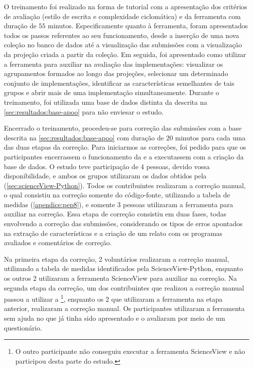 		O treinamento foi realizado na forma de tutorial com a apresentação dos critérios
		de avaliação (estilo de escrita e complexidade ciclomática) e da ferramenta com
		duração de $55$ minutos. Especificamente quanto à ferramenta, foram apresentados
		todos os passos referentes ao seu funcionamento, desde a inserção de uma nova
		coleção no banco de dados até a visualização das submissões com a visualização
		da projeção criada a partir da coleção. Em seguida, foi apresentado como utilizar
		a ferramenta para auxiliar na avaliação das implementações: visualizar os
		agrupamentos formados ao longo das projeções, selecionar um determinado conjunto
		de implementações, identificar as características semelhantes de tais grupos e
		abrir mais de uma implementação simultaneamente. Durante o treinamento, foi utilizada uma
		base de dados distinta da descrita na \cref{sec:resultados:base-apoo} para não
		enviesar o estudo.
		
		Encerrado o treinamento, procedeu-se para correção das submissões com a base
		descrita na \cref{sec:resultados:base-apoo} com duração de $20$ minutos para
		cada uma das duas etapas da correção. Para iniciarmos as correções, foi
		pedido para que os participantes encerrassem o funcionamento da 
		e a executassem com a criação da base de dados. O estudo teve participação
		de 4 pessoas, devido vossa disponibilidade, e ambos os grupos utilizaram os
		dados obtidos pela  (\cref{sec:scienceView-Python}).
		Todos os contribuintes realizaram a correção manual, o qual consistiu na correção
		somente do código-fonte, utilizando a tabela de medidas (\cref{apendice:pep8}),
		e somente 3 pessoas utilizaram a ferramenta  para auxiliar
		na correção. Essa etapa de correção consistiu em duas fases, todas envolvendo a
		correção das submissões, considerando os tipos de erros apontados na extração
		de características e a criação de um relato com os programas avaliados e
		comentários de correção.

		Na primeira etapa da correção, 2 voluntários realizaram a correção manual,
		utilizando a tabela de medidas identificados pela ScienceView-Python, enquanto
		os outros 2 utilizaram a ferramenta ScienceView para auxiliar na correção. Na
		segunda etapa da correção, um dos contribuintes que realizou a correção manual
		passou a utilizar a \footnote{O outro participante não
		conseguiu executar a ferramenta ScienceView e não participou desta parte do
		estudo.}, enquanto os 2 que utilizaram a ferramenta na etapa anterior, realizaram
		a correção manual. Os participantes utilizaram a ferramenta sem ajuda no que já
		tinha sido apresentado e o avaliaram por meio de um questionário. 	

